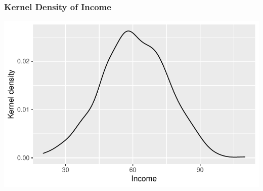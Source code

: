 \documentclass{beamer}\usepackage[]{graphicx}\usepackage[]{xcolor}
\makeatletter
\def\maxwidth{ %
  \ifdim\Gin@nat@width>\linewidth
    \linewidth
  \else
    \Gin@nat@width
  \fi
}
\newenvironment{knitrout}{}{} %
\makeatother
\begin{document}
\begin{frame}[fragile]\frametitle{Kernel Density of Income}
\begin{knitrout}\footnotesize
{}\color{fgcolor}

{\centering \includegraphics[width=\maxwidth]{figure/unnamed-chunk-22-1} 

}


\end{knitrout}
\end{frame}
\end{document}
